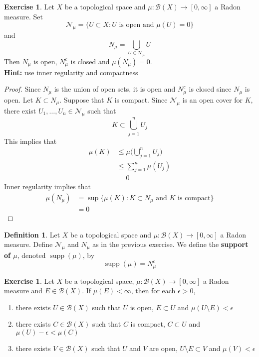 \documentclass[12pt]{amsart}
\theoremstyle{definition}
\newtheorem{defn}[definition]{Definition}
\newtheorem{ex}[definition]{Exercise}
\newcommand{\ep}{\epsilon}
\newcommand{\MB}{\mathcal{B}}
\newcommand{\MN}{\mathcal{N}}
\newcommand{\RG}{[0,\infty]}
\DeclareMathOperator{\supp}{supp}
\newcommand{\lex}[1]{\label{ex:#1}}
\newcommand{\ld}[1]{\label{defn:#1}}
\begin{document}
	\begin{ex} \lex{00000} 
	Let $X$ be a topological space and $\mu: \MB(X) \rightarrow \RG$ a Radon measure. Set $$\MN_{\mu} = \{U \subset X: U \text{ is open and } \mu(U) = 0\}$$ and $$N_{\mu} = \bigcup_{U \in \MN_{\mu}} U$$ 
	Then $N_{\mu}$ is open, $N_{\mu}^c$ is closed and $\mu(N_{\mu}) = 0$.\\
	\textbf{Hint:} use inner regularity and compactness
	\end{ex}
	
	\begin{proof}
	Since $N_{\mu}$ is the union of open sets, it is open and $N_{\mu}^c$ is closed since $N_{\mu}$ is open. Let $K \subset N_{\mu}$. Suppose that $K$ is compact. Since $\MN_{\mu}$ is an open cover for $K$, there exist $U_1, \ldots, U_n \in \MN_{\mu}$ such that $$K \subset \bigcup_{j=1}^n U_j$$ 
	This implies that 
	\begin{align*}
	\mu(K) 
	&\leq \mu\bigg( \bigcup_{j=1}^n U_j \bigg) \\
	& \leq \sum_{j=1}^n \mu(U_j) \\
	&= 0
	\end{align*}
	Inner regularity implies that 
	\begin{align*}
	\mu(N_{\mu}) 
	&= \sup \{ \mu(K): K \subset N_{\mu} \text{ and $K$ is compact}\} \\
	&= 0
	\end{align*}
	\end{proof}
	
	\begin{defn} \ld{00000} 
	Let $X$ be a topological space and $\mu: \MB(X) \rightarrow \RG$ a Radon measure. Define $\MN_{\mu}$ and $N_{\mu}$ as in the previous exercise. We define the \textbf{support of $\mu$}, denoted $\supp(\mu)$, by $$\supp(\mu) = N_{\mu}^c $$
	\end{defn}
	
	\begin{ex} \lex{00000} 
	Let $X$ be a topological space, $\mu: \MB(X) \rightarrow \RG$ a Radon measure and $E \in \MB(X)$. If $\mu(E) < \infty$, then for each $\ep >0$, 
	\begin{enumerate}
	\item there exists $U \in \MB(X)$ such that $U$ is open, $E \subset U$ and $\mu(U \setminus E) < \ep$ 
	\item there exists $C \in \MB(X)$ such that $C$ is compact, $C \subset U$ and $\mu(U) - \ep < \mu(C)$ 
	\item there exists $V \in \MB(X)$ such that $U$ and $V$ are open, $U \setminus E \subset V$ and $\mu(V) < \ep$ 
	\end{enumerate}
	\end{ex}
	
\end{document}
